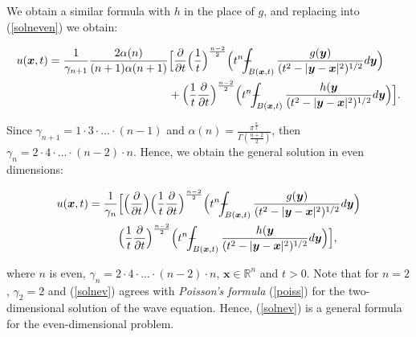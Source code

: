 \documentclass[a4paper, 12pt]{article}
\def\Xint#1{\mathchoice
{\XXint\displaystyle\textstyle{#1}}%
{\XXint\textstyle\scriptstyle{#1}}%
{\XXint\scriptstyle\scriptscriptstyle{#1}}%
{\XXint\scriptscriptstyle\scriptscriptstyle{#1}}%
\!\int}
\def\XXint#1#2#3{{\setbox0=\hbox{$#1{#2#3}{\int}$ }
\vcenter{\hbox{$#2#3$ }}\kern-.6\wd0}}
\def\dashint{\Xint-}
\numberwithin{equation}{section}
\begin{document}
We obtain a similar formula with $h$ in the place of $g$, and replacing into
(\ref{solneven}) we obtain:

\begin{equation*}
    \begin{split}
        u(\boldsymbol{x}, t)= \frac{1}{\gamma_{n+1}} \frac{2 \alpha(n)}{(n+1) \alpha (n+1)}&\Big[ \diffp[1]{}{t} \Big(\frac{1}{t} \Big)^{\frac{n-2}{2}} \Big(t^n \dashint_{B(\boldsymbol{x}, t)} \frac{g(\boldsymbol{y})}{(t^2-|\boldsymbol{y}-\boldsymbol{x}|^2)^{1/2}} d \boldsymbol{y} \Big)\\ 
        & +\Big(\frac{1}{t} \diffp[1]{}{t}\Big)^{\frac{n-2}{2}} \Big(t^n \dashint_{B(\boldsymbol{x},t)} \frac{h(\boldsymbol{y}}{(t^2-|\boldsymbol{y}-\boldsymbol{x}|^2)^{1/2}} d \boldsymbol{y} \Big) \Big].
    \end{split}
\end{equation*}

Since $\gamma_{n+1}=1 \cdot 3 \cdot ... \cdot (n-1)$ and
$\alpha(n)=\frac{\pi^{\frac{n}{2}}}{\Gamma(\frac{n+2}{2})}$, then $\gamma_n=2
\cdot 4 \cdot ... \cdot(n-2) \cdot n$. Hence, we obtain the general solution in
even dimensions:

\begin{equation} \label{solnev}
    \begin{split}
        u(\boldsymbol{x}, t)= \frac{1}{\gamma_n} &\Big[ \Big(\diffp[1]{}{t}\Big) \Big(\frac{1}{t} \diffp[1]{}{t}\Big)^{\frac{n-2}{2}}\Big(t^n \dashint_{B(\boldsymbol{x}, t)} \frac{g(\boldsymbol{y})}{(t^2-|\boldsymbol{y}-\boldsymbol{x}|^2)^{1/2}} d \boldsymbol{y} \Big)\\
        &\Big(\frac{1}{t} \diffp[1]{}{t}\Big)^{\frac{n-2}{2}}\Big(t^n \dashint_{B(\boldsymbol{x},t)} \frac{h(\boldsymbol{y}}{(t^2-|\boldsymbol{y}-\boldsymbol{x}|^2)^{1/2}} d \boldsymbol{y} \Big) \Big],
    \end{split}
\end{equation}

where $n$ is even, $\gamma_n=2 \cdot 4 \cdot ... \cdot(n-2) \cdot n$,
$\boldsymbol{x}\in \mathbb{R}^n$ and $t>0$. Note that for $n=2$, $\gamma_2 = 2$
and (\ref{solnev}) agrees with \emph{Poisson's formula} (\ref{poiss}) for the
two-dimensional solution of the wave equation. Hence, (\ref{solnev}) is a
general formula for the even-dimensional problem.
\end{document}

